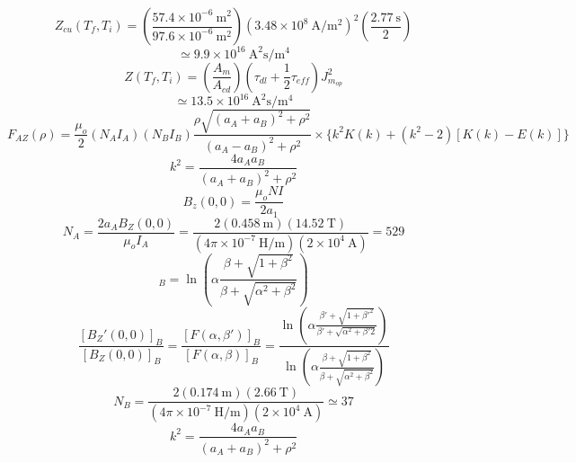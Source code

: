 \begin{equation}%
Z_{cu}(T_f,T_i)=(\frac{57.4\times10^{-6}\ \mathrm{m^2}}{97.6\times10^{-6}\ \mathrm{m^2}})(3.48\times10^8\ \mathrm{A/m^2})^2(\frac{2.77\ \mathrm{s}}{2})
\end{equation}
\begin{equation}%
\simeq9.9\times10^{16}\ \mathrm{A^2s/m^4}
\end{equation}
\begin{equation}%
Z(T_f,T_i)=(\frac{A_m}{A_{cd}})(\tau_{dl}+\frac{1}{2}\tau_{eff})J_{m_{op}}^2
\end{equation}
\begin{equation}%
\simeq13.5\times10^{16}\ \mathrm{A^2s/m^4}
\end{equation}
\begin{equation}%
F_{AZ}(\rho)=\frac{\mu_o}{2}(N_AI_A)(N_BI_B)\frac{\rho\sqrt{(a_A+a_B)^2+\rho^2}}{(a_A-a_B)^2+\rho^2}
\times\{k^2K(k)+(k^2-2)[K(k)-E(k)]\}
\end{equation}
\begin{equation}%
k^2=\frac{4a_Aa_B}{(a_A+a_B)^2+\rho^2}
\end{equation}
\begin{equation}%
B_z(0,0)=\frac{\mu_oNI}{2a_1}
\end{equation}
\begin{equation}%
N_A=\frac{2a_AB_Z(0,0)}{\mu_oI_A}=\frac{2(0.458\ \mathrm{m})(14.52\ \mathrm{T})}{(4\pi\times10^{-7}\ \mathrm{H/m})(2\times10^4\ \mathrm{A})}=529
\end{equation}
\begin{equation}%
[F(\alpha,\beta)]_B=\ln(\alpha\frac{\beta+\sqrt{1+\beta^2}}{\beta+\sqrt{\alpha^2+\beta^2}})
\end{equation}
\begin{equation}%
\frac{[B_Z'(0,0)]_B}{[B_Z(0,0)]_B}
=\frac{[F(\alpha,\beta')]_B}{[F(\alpha,\beta)]_B}
=\frac{\ln(\alpha\frac{\beta'+\sqrt{1+\beta'^2}}{\beta'+\sqrt{\alpha^2+\beta'2}})}{\ln(\alpha\frac{\beta+\sqrt{1+\beta^2}}{\beta+\sqrt{\alpha^2+\beta^2}})}
\end{equation}
\begin{equation}%
N_B=\frac{2(0.174\ \mathrm{m})(2.66\ \mathrm{T})}{(4\pi\times10^{-7}\ \mathrm{H/m})(2\times10^4\ \mathrm{A})}\simeq37
\end{equation}
\begin{equation}%
k^2=\frac{4a_Aa_B}{(a_A+a_B)^2+\rho^2}
\end{equation}
